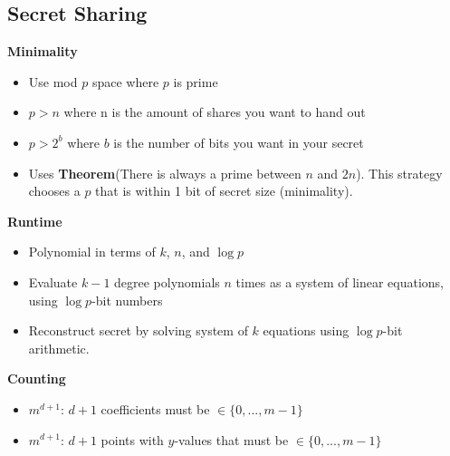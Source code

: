 \documentclass{article}\usepackage{amsmath,amssymb,amsthm,tikz,tkz-graph,color,chngpage,soul,hyperref,csquotes,graphicx,floatrow, listings,polynom}\newcommand*{\QEDB}{\hfill\ensuremath{\square}}\newtheorem*{prop}{Proposition}\renewcommand{\theenumi}{\alph{enumi}}\usepackage[shortlabels]{enumitem}\usepackage[nobreak=true]{mdframed}\usetikzlibrary{matrix,calc}\MakeOuterQuote{"}\usepackage[margin=0.75in]{geometry} \newtheorem{theorem}{Theorem}\newcommand{\Z}{\mathbb Z}\newcommand{\R}{\mathbb R}\newcommand{\Q}{\mathbb Q}\newcommand{\N}{\mathbb N}\newcommand{\x}[1]{\textrm{ #1 }}\newcommand{\pr}{\textrm{Pr}}
\begin{document}
\subsection*{Secret Sharing}
\textbf{Minimality}
\begin{itemize}
\item Use mod $p$ space where $p$ is prime
\item $p > n$ where n is the amount of shares you want to hand out
\item $p > 2^b$ where $b$ is the number of bits you want in your secret
\item Uses \textbf{Theorem}(There is always a prime between $n$ and $2n$). This strategy chooses a $p$ that is within 1 bit of secret size (minimality).
\end{itemize}
\textbf{Runtime}
\begin{itemize}
\item Polynomial in terms of $k$, $n$, and $\log{p}$
\item Evaluate $k-1$ degree polynomials $n$ times as a system of linear equations, using $\log{p}$-bit numbers
\item Reconstruct secret by solving system of $k$ equations using $\log{p}$-bit arithmetic.
\end{itemize}
\textbf{Counting}
\begin{itemize}
\item $m^{d+1}$: $d+1$ coefficients must be $\in \{0, ..., m-1\}$
\item $m^{d+1}$: $d+1$ points with $y$-values that must be $\in \{0, ..., m-1\}$
\end{itemize}

\pagebreak
\end{document}
